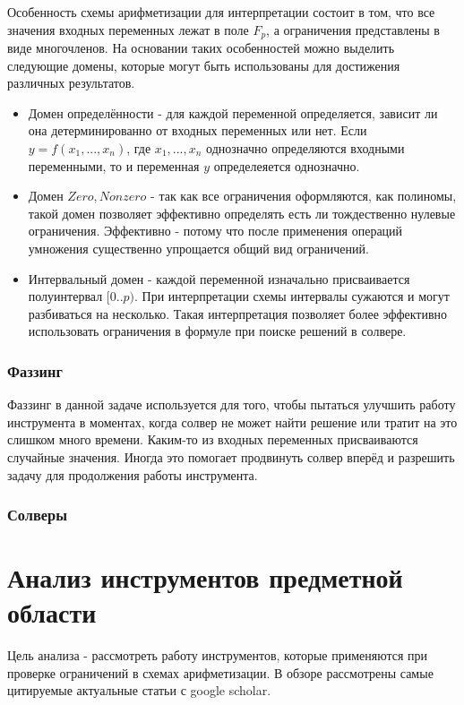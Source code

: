 \documentclass[a4paper]{article}
\begin{document}
Особенность схемы арифметизации для интерпретации состоит в том, что все значения входных переменных лежат в поле $F_p$, а ограничения представлены в виде многочленов. На основании таких особенностей можно выделить следующие домены, которые могут быть использованы для достижения различных результатов.
\begin{itemize}
    \item Домен определённости - для каждой переменной определяется, зависит ли она детерминированно от входных переменных или нет. Если $y = f(x_1, ..., x_n)$, где $x_1, ..., x_n$ однозначно определяются входными переменными, то и переменная $y$ определеяется однозначно.
    \item Домен ${Zero, Nonzero}$ - так как все ограничения оформляются, как полиномы, такой домен позволяет эффективно определять есть ли тождественно нулевые ограничения. Эффективно - потому что после применения операций умножения существенно упрощается общий вид ограничений.
    \item Интервальный домен - каждой переменной изначально присваивается полуинтервал $[0..p)$. При интерпретации схемы интервалы сужаются и могут разбиваться на несколько. Такая интерпретация позволяет более эффективно использовать ограничения в формуле при поиске решений в солвере.
\end{itemize}

\subsubsection{Фаззинг}
Фаззинг в данной задаче используется для того, чтобы пытаться улучшить работу инструмента в моментах, когда солвер не может найти решение или тратит на это слишком много времени. Каким-то из входных переменных присваиваются случайные значения. Иногда это помогает продвинуть солвер вперёд и разрешить задачу для продолжения работы инструмента.

\subsubsection{Солверы}

\newpage
\section{Анализ инструментов предметной области}
\indent

Цель анализа - рассмотреть работу инструментов, которые применяются при проверке ограничений в схемах арифметизации. В обзоре рассмотрены самые цитируемые актуальные статьи с google scholar.
\end{document}
